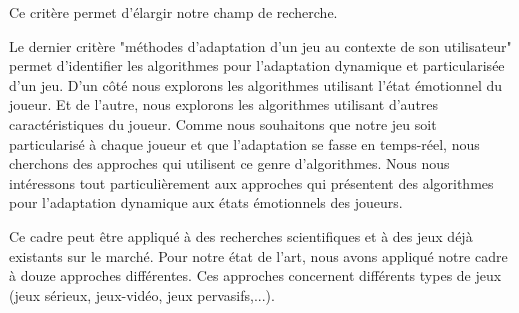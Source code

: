 \documentclass[11pt]{article}
\begin{document}
			Ce critère permet d'élargir notre champ de recherche.\par
			Le dernier critère "méthodes d'adaptation d'un jeu au contexte de son utilisateur" permet d'identifier les algorithmes pour l'adaptation dynamique et particularisée d'un jeu.
			D'un côté nous explorons les algorithmes utilisant l'état émotionnel du joueur.
			Et de l'autre, nous explorons les algorithmes utilisant d'autres caractéristiques du joueur.
			Comme nous souhaitons que notre jeu soit particularisé à chaque joueur et que l'adaptation se fasse en temps-réel, nous cherchons des approches qui utilisent ce genre d'algorithmes.
			Nous nous intéressons tout particulièrement aux approches qui présentent des algorithmes pour l'adaptation dynamique aux états émotionnels des joueurs.\par
			Ce cadre peut être appliqué à des recherches scientifiques et à des jeux déjà existants sur le marché.
			Pour notre état de l'art, nous avons appliqué notre cadre à douze approches différentes.
			Ces approches concernent différents types de jeux (jeux sérieux, jeux-vidéo, jeux pervasifs,...).
\end{document}
